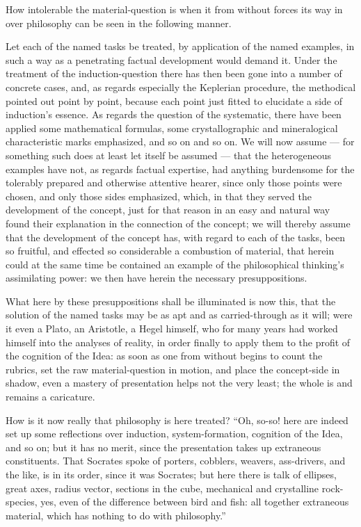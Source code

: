 \documentclass[12pt]{book}
\begin{document}
How intolerable the material-question is when it from without forces its way in over philosophy can be seen
in the following manner.

Let each of the named tasks be treated, by application of the named examples, in such a way as a penetrating
factual development would demand it. Under the treatment of the induction-question there has then been gone
into a number of concrete cases, and, as regards especially the Keplerian procedure, the methodical pointed
out point by point,
because each point just fitted to elucidate a side of induction's essence. As regards the question of the
systematic, there have been applied some mathematical
formulas, some crystallographic and mineralogical characteristic marks emphasized, and so on and so on. We
will now assume --- for something such does at least let itself be assumed --- that the heterogeneous
examples have not, as regards factual expertise, had anything burdensome for the tolerably prepared and
otherwise attentive hearer, since only those points were chosen, and only those sides emphasized, which, in
that they served the development of the concept, just for that reason in an easy and natural way found their
explanation in the connection of the concept; we will thereby assume that the development of the concept
has, with regard to each of the tasks, been so fruitful, and effected so considerable a combustion of
material, that herein could at the same time be contained an example of the philosophical thinking's
assimilating power: we then have herein the necessary presuppositions.

What here by these presuppositions shall be illuminated is now this, that the solution of the named tasks
may be as apt and as carried-through as it will; were it even a Plato, an Aristotle, a Hegel himself, who
for many years had worked himself into the analyses of reality, in order finally to apply them to the profit
of the cognition of the Idea: as soon as one from without begins to count the rubrics, set the raw
material-question in motion, and place the concept-side in shadow, even a mastery of presentation helps not
the very least; the whole is and remains a caricature.

How is it now really that philosophy is here treated? ``Oh, so-so! here are indeed set up some reflections
over induction, system-formation, cognition of the Idea, and so on; but it has no merit, since the
presentation takes up extraneous constituents. That Socrates spoke of porters, cobblers, weavers,
ass-drivers, and the like, is in its order, since it was Socrates; but here there is talk of ellipses, great
axes, radius vector, sections in the cube, mechanical and crystalline rock-species, yes, even of the
difference between bird and fish: all
together extraneous material, which has nothing to do with philosophy.''
\end{document}
